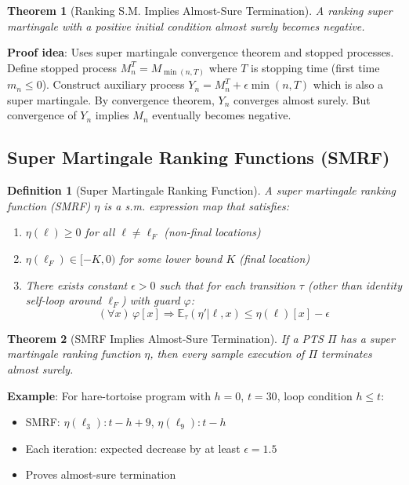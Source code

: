 \documentclass{article}
\newtheorem{definition}{Definition}
\newtheorem{theorem}{Theorem}
\begin{document}
\begin{theorem}[Ranking S.M. Implies Almost-Sure Termination]
A ranking super martingale with a positive initial condition almost surely becomes negative.
\end{theorem}

\textbf{Proof idea}: Uses super martingale convergence theorem and stopped processes. Define stopped process $M^T_n = M_{\min(n, T)}$ where $T$ is stopping time (first time $m_n \leq 0$). Construct auxiliary process $Y_n = M^T_n + \epsilon \min(n, T)$ which is also a super martingale. By convergence theorem, $Y_n$ converges almost surely. But convergence of $Y_n$ implies $M_n$ eventually becomes negative.

\subsection{Super Martingale Ranking Functions (SMRF)}

\begin{definition}[Super Martingale Ranking Function]
A super martingale ranking function (SMRF) $\eta$ is a s.m. expression map that satisfies:
\begin{enumerate}
    \item $\eta(\ell) \geq 0$ for all $\ell \neq \ell_F$ (non-final locations)

    \item $\eta(\ell_F) \in [-K, 0)$ for some lower bound $K$ (final location)

    \item There exists constant $\epsilon > 0$ such that for each transition $\tau$ (other than identity self-loop around $\ell_F$) with guard $\varphi$:
    \begin{equation}
    (\forall x) \, \varphi[x] \Rightarrow \mathbb{E}_\tau(\eta' | \ell, x) \leq \eta(\ell)[x] - \epsilon
    \end{equation}
\end{enumerate}
\end{definition}

\begin{theorem}[SMRF Implies Almost-Sure Termination]
If a PTS $\Pi$ has a super martingale ranking function $\eta$, then every sample execution of $\Pi$ terminates almost surely.
\end{theorem}

\textbf{Example}: For hare-tortoise program with $h = 0$, $t = 30$, loop condition $h \leq t$:
\begin{itemize}
    \item SMRF: $\eta(\ell_3): t - h + 9$, $\eta(\ell_9): t - h$
    \item Each iteration: expected decrease by at least $\epsilon = 1.5$
    \item Proves almost-sure termination
\end{itemize}
\end{document}
